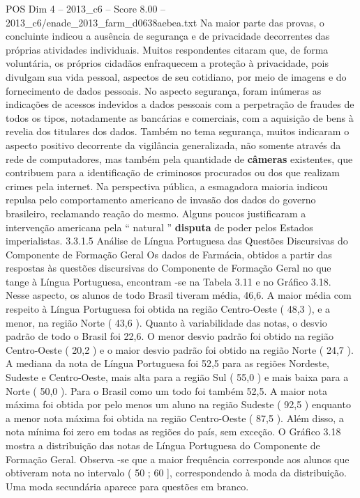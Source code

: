 \begin{textsample}{POS Dim 4 – 2013\_c6 – Score 8.00 – 2013\_c6/enade\_2013\_farm\_d0638aebea.txt}
Na maior parte das provas, o concluinte indicou a ausência de segurança e de privacidade decorrentes das próprias atividades individuais.
Muitos respondentes citaram que, de forma voluntária, os próprios cidadãos enfraquecem a proteção à privacidade, pois divulgam sua vida pessoal, aspectos de seu cotidiano, por meio de imagens e do fornecimento de dados pessoais.
No aspecto segurança, foram inúmeras as indicações de acessos indevidos a dados pessoais com a perpetração de fraudes de todos os tipos, notadamente as bancárias e comerciais, com a aquisição de bens à revelia dos titulares dos dados.
Também no tema segurança, muitos indicaram o aspecto positivo decorrente da vigilância generalizada, não somente através da rede de computadores, mas também pela quantidade de \textbf{câmeras} existentes, que contribuem para a identificação de criminosos procurados ou dos que realizam crimes pela internet.
Na perspectiva pública, a esmagadora maioria indicou repulsa pelo comportamento americano de invasão dos dados do governo brasileiro, reclamando reação do mesmo.
Alguns poucos justificaram a intervenção americana pela “ natural ” \textbf{disputa} de poder pelos Estados imperialistas. 3.3.1.5 Análise de Língua Portuguesa das Questões Discursivas do Componente de Formação Geral Os dados de Farmácia, obtidos a partir das respostas às questões discursivas do Componente de Formação Geral no que tange à Língua Portuguesa, encontram -se na Tabela 3.11 e no Gráfico 3.18.
Nesse aspecto, os alunos de todo Brasil tiveram média, 46,6.
A maior média com respeito à Língua Portuguesa foi obtida na região Centro-Oeste ( 48,3 ), e a menor, na região Norte ( 43,6 ).
Quanto à variabilidade das notas, o desvio padrão de todo o Brasil foi 22,6.
O menor desvio padrão foi obtido na região Centro-Oeste ( 20,2 ) e o maior desvio padrão foi obtido na região Norte ( 24,7 ).
A mediana da nota de Língua Portuguesa foi 52,5 para as regiões Nordeste, Sudeste e Centro-Oeste, mais alta para a região Sul ( 55,0 ) e mais baixa para a Norte ( 50,0 ).
Para o Brasil como um todo foi também 52,5.
A maior nota máxima foi obtida por pelo menos um aluno na região Sudeste ( 92,5 ) enquanto a menor nota máxima foi obtida na região Centro-Oeste ( 87,5 ).
Além disso, a nota mínima foi zero em todas as regiões do país, sem exceção.
O Gráfico 3.18 mostra a distribuição das notas de Língua Portuguesa do Componente de Formação Geral.
Observa -se que a maior frequência corresponde aos alunos que obtiveram nota no intervalo ( 50 ; 60 ], correspondendo à moda da distribuição.
Uma moda secundária aparece para questões em branco.

\end{textsample}
